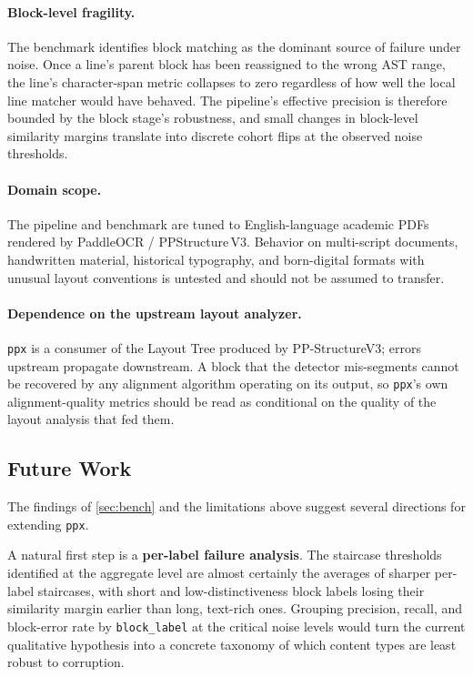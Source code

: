 \documentclass{article}
\theoremstyle{definition}
\begin{document}
\paragraph{Block-level fragility.}
The benchmark identifies block matching as the dominant source of
failure under noise.  Once a line's parent block has been reassigned
to the wrong AST range, the line's character-span metric collapses
to zero regardless of how well the local line matcher would have
behaved.  The pipeline's effective precision is therefore bounded by
the block stage's robustness, and small changes in block-level
similarity margins translate into discrete cohort flips at the
observed noise thresholds.

\paragraph{Domain scope.}
The pipeline and benchmark are tuned to English-language academic
PDFs rendered by PaddleOCR / PPStructure\,V3.  Behavior on
multi-script documents, handwritten material, historical typography,
and born-digital formats with unusual layout conventions is untested
and should not be assumed to transfer.

\paragraph{Dependence on the upstream layout analyzer.}
\texttt{ppx} is a consumer of the Layout Tree produced by
PP-StructureV3; errors upstream propagate downstream.  A block that
the detector mis-segments cannot be recovered by any alignment
algorithm operating on its output, so \texttt{ppx}'s own
alignment-quality metrics should be read as conditional on the
quality of the layout analysis that fed them.

\subsection{Future Work}

The findings of \cref{sec:bench} and the limitations above suggest
several directions for extending \texttt{ppx}.

A natural first step is a \textbf{per-label failure analysis}.  The
staircase thresholds identified at the aggregate level are almost
certainly the averages of sharper per-label staircases, with short
and low-distinctiveness block labels losing their similarity margin
earlier than long, text-rich ones.  Grouping precision, recall, and
block-error rate by \texttt{block\_label} at the critical noise
levels would turn the current qualitative hypothesis into a concrete
taxonomy of which content types are least robust to corruption.
\end{document}
